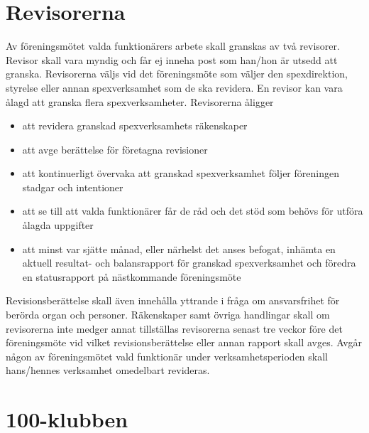 \documentclass[a4paper]{article}
\begin{document}
\section{Revisorerna}
\label{section:revisorerna}

Av föreningsmötet valda funktionärers arbete skall granskas av två revisorer. Revisor skall vara myndig och får ej inneha post som han/hon är utsedd att granska.\newline
\newline
Revisorerna väljs vid det föreningsmöte som väljer den spexdirektion, styrelse eller annan spexverksamhet som de ska revidera. En revisor kan vara ålagd att granska flera spexverksamheter.\newline
\newline
Revisorerna åligger

\begin{itemize}
  \item att revidera granskad spexverksamhets räkenskaper
  \item att avge berättelse för företagna revisioner
  \item att kontinuerligt övervaka att granskad spexverksamhet följer föreningen stadgar och intentioner
  \item att se till att valda funktionärer får de råd och det stöd som behövs för utföra ålagda uppgifter
  \item att minst var sjätte månad, eller närhelst det anses befogat, inhämta en aktuell resultat- och balansrapport för granskad spexverksamhet och föredra en statusrapport på nästkommande föreningsmöte
\end{itemize}

\noindent
Revisionsberättelse skall även innehålla yttrande i fråga om ansvarsfrihet för berörda organ och personer.\newline
\newline
Räkenskaper samt övriga handlingar skall om revisorerna inte medger annat tillställas revisorerna senast tre veckor före det föreningsmöte vid vilket revisionsberättelse eller annan rapport skall avges.\newline
\newline
Avgår någon av föreningsmötet vald funktionär under verksamhetsperioden skall hans/hennes verksamhet omedelbart revideras.

\section{100-klubben}
\label{section:100-klubben}
\end{document}
